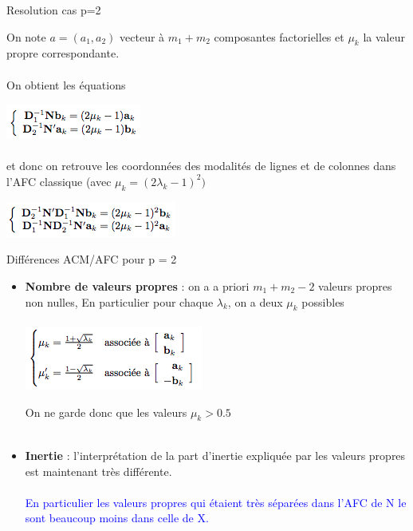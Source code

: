 \documentclass[11pt]{beamer}
\begin{document}
\begin{frame}{Resolution cas p=2}
 
\centering 

 On note $a = (a_{1},  a_{2})$ vecteur à $m_1 +  m_2$ composantes   factorielles et $\mu_k$ la valeur propre correspondante.\\ \ \\
 
 
  
  On obtient les équations
  
   \includegraphics[scale=0.7]{AFC2} \\ \ \\
  
 et donc on retrouve les coordonnées des modalités de lignes
et de colonnes dans l'AFC classique (avec 
$\mu_k =(2\lambda_k - 1)^2) $

 \includegraphics[scale=0.7]{AFC3} 
 
\end{frame}






\begin{frame}{Différences ACM/AFC pour p = 2}
 
\begin{itemize}
 \item \textbf{ Nombre de valeurs propres} : on a a priori $m_1 + m_2 - 2$ valeurs propres non nulles, En particulier pour chaque $\lambda_k$, on a deux $\mu_k$ possibles\\~\\
 
 \includegraphics[scale=0.6]{AFC4} 
 
 On ne garde donc que les valeurs $\mu_k >0.5$\\~\\
 
 \item \textbf{Inertie} : l'interprétation de la part d'inertie expliquée par
les valeurs propres est maintenant très différente. \\~\\
\textcolor{blue}{En particulier les valeurs propres qui étaient très séparées dans
l’AFC de N le sont beaucoup moins dans celle de X.}
 
 \end{itemize} 
 
\end{frame}
\end{document}
